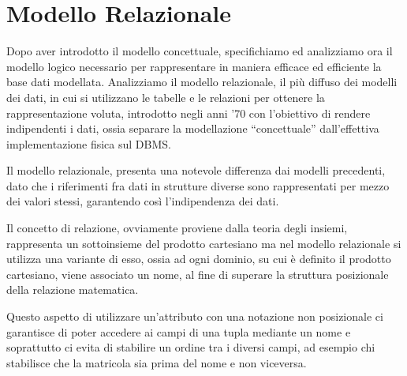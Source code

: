 \documentclass[a4paper,12pt, oneside]{book}
\begin{document}
\chapter{Modello Relazionale}
Dopo aver introdotto il modello concettuale, specifichiamo ed analizziamo ora il modello logico necessario per 
rappresentare in maniera efficace ed efficiente la base dati modellata.\newline
Analizziamo il modello relazionale, il più diffuso dei modelli dei dati, in cui si utilizzano le tabelle e le relazioni
per ottenere la rappresentazione voluta, introdotto negli anni '70 con l'obiettivo di rendere indipendenti i dati,
ossia separare la modellazione ``concettuale'' dall'effettiva implementazione fisica sul DBMS.

Il modello relazionale, presenta una notevole differenza dai modelli precedenti, dato che i riferimenti
fra dati in strutture diverse sono rappresentati per mezzo dei valori stessi, garantendo così l'indipendenza dei dati.

Il concetto di relazione, ovviamente proviene dalla teoria degli insiemi, rappresenta un sottoinsieme
del prodotto cartesiano ma nel modello relazionale si utilizza una variante di esso, ossia ad ogni dominio,
su cui è definito il prodotto cartesiano, viene associato un nome, al fine di superare 
la struttura posizionale della relazione matematica.

Questo aspetto di utilizzare un'attributo con una notazione non posizionale ci garantisce di poter 
accedere ai campi di una tupla mediante un nome e soprattutto ci evita di stabilire un ordine tra 
i diversi campi, ad esempio chi stabilisce che la matricola sia prima del nome e non viceversa.
\end{document}
